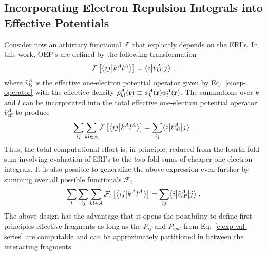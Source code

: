 \subsection{\label{ss:2.3}Incorporating Electron Repulsion Integrals into Effective Potentials}

Consider now an arbirtary functional $\mathcal{F}$ that explicitly depends on the 
ERI's. In this work, OEP's are defined by the following transformation
%
 \begin{equation}
 \mathcal{F}
 \left[ 
   \bigl\langle {ij} \bigl\lvert {k^Al^A} \bigr\rangle
	 \right] = \bigl\langle {i} \bigl\lvert {\hat{v}_{kl}^A} \bigl\lvert {j} \bigr\rangle  \;,
 \end{equation}
%
where 
$\hat{v}_{kl}^A$ is the effective one-electron potential operator given by Eq.~\eqref{e:oep-operator} 
with the
effective density $\rho_{kl}^A({\bf r}) \equiv \phi_k^A({\bf r})\phi_l^A({\bf r})$.
The summations over $k$ and $l$ can be incorporated into the total effective one-electron potential operator
$\hat{v}_{\text{eff}}^A$
to produce
%
\begin{equation}
	\sum_{ij}\sum_{kl\in A} \mathcal{F}\left[ 
   \bigl\langle {ij} \bigl\lvert {k^Al^A} \bigr\rangle
 \right] = \sum_{ij} \bigl\langle {i} \bigl\lvert {\hat{v}_{\text{eff}}^A} \bigl\lvert {j} \bigr\rangle  \;.
\end{equation}
%
Thus, the total computational effort is, in principle, reduced from the fourth-fold
sum involving evaluation of ERI's to the two-fold sums of cheaper one-electron integrals.
It is also possible to generalize the above expression even further by
summing over all possible functionals ${\mathcal{F}}_t$
%
\begin{equation} \label{e:ft-reduction}
	\sum_t \sum_{ij}\sum_{kl\in A} {\mathcal{F}}_t\left[ 
   \bigl\langle {ij} \bigl\lvert {k^Al^A} \bigr\rangle
 \right] = \sum_{ij} \bigl\langle {i} \bigl\lvert {\hat{v}_{\text{eff}}^A} \bigl\lvert {j} \bigr\rangle \;.
\end{equation}
%
The above design has the advantage that it opens the possibility to define first\hyp{}principles
effective fragments as long as the $P_{ij}$ and $P_{ijkl}$ 
from Eq.~\eqref{e:exp-val-series} are computable and can be approximately
partitioned in between the interacting fragments.

